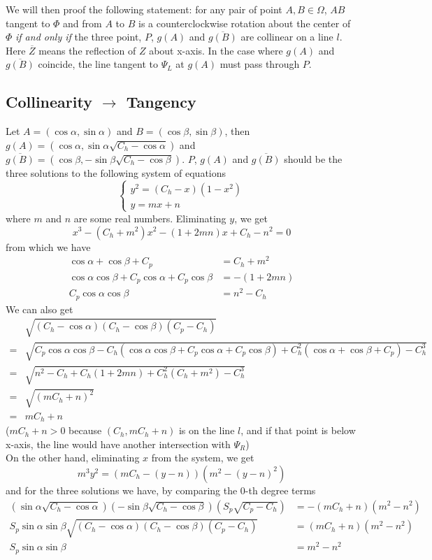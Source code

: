 \documentclass[]{article}
\begin{document}
We will then proof the following statement: for any pair of point $A, B \in \Omega$, $AB$ tangent to $\Phi$ and from $A$ to $B$ is a counterclockwise rotation about the center of $\Phi$ \textit{if and only if} the three point, $P$, $g(A)$ and $\overline{g(B)}$ are collinear on a line $l$. Here $\overline{Z}$ means the reflection of $Z$ about x-axis. In the case where $g(A)$ and $\overline{g(B)}$ coincide, the line tangent to $\Psi_L$ at $g(A)$ must pass through $P$.

\subsection{Collinearity $\to$ Tangency}
Let $A = (\cos\alpha, \sin\alpha)$ and $B = (\cos\beta,\sin\beta)$, then $g(A) = (\cos\alpha, \sin\alpha\sqrt{C_h - \cos\alpha})$ and  $\overline{g(B)} = (\cos\beta, -\sin\beta\sqrt{C_h - \cos\beta})$.  $P$, $g(A)$ and $\overline{g(B)}$ should be the three solutions to the following system of equations
\[
\begin{cases}
y^2 = \left(C_h-x\right)(1-x^2)\\
y = mx + n
\end{cases}
\]
where $m$ and $n$ are some real numbers. Eliminating $y$, we get
\[
x^3 - (C_h+m^2)x^2-(1+2mn)x+C_h-n^2=0
\]
from which we have 
\begin{align*}
\cos\alpha+\cos\beta+C_p &= C_h + m^2\\
\cos\alpha\cos\beta + C_p\cos\alpha +C_p\cos\beta  &= -(1+2mn)\\
C_p\cos\alpha\cos\beta  &= n^2-C_h
\end{align*}
We can also get
\begin{align*}
&\sqrt{(C_h-\cos\alpha)(C_h-\cos\beta)(C_p-C_h)} \\
=&\sqrt{C_p\cos\alpha\cos\beta  - C_h(\cos\alpha\cos\beta +C_p \cos\alpha +C_p\cos\beta ) +C_h^2(\cos\alpha+\cos\beta+C_p)-C_h^3}\\
=&\sqrt{n^2-C_h + C_h(1+2mn) +C_h^2(C_h + m^2)-C_h^3}\\
=&\sqrt{(mC_h+n)^2}\\
=&mC_h+n
\end{align*}
($mC_h+n > 0$ because $(C_h, mC_h+n)$ is on the line $l$, and if that point is below x-axis, the line would have another intersection with $\Psi_R$) \\On the other hand, eliminating $x$ from the system, we get
\[
m^3y^2 = (mC_h - (y-n))(m^2 - (y-n)^2)
\]
and for the three solutions we have, by comparing the 0-th degree terms
\begin{align*}
 (\sin\alpha\sqrt{C_h - \cos\alpha}) (-\sin\beta\sqrt{C_h - \cos\beta}) (S_p \sqrt{C_p-C_h}) &= -(mC_h+n)(m^2-n^2)\\
S_p\sin\alpha\sin\beta \sqrt{(C_h - \cos\alpha)(C_h - \cos\beta)(C_p-C_h)} &= (mC_h+n)(m^2-n^2)\\
 S_p\sin\alpha\sin\beta  &= m^2 - n^2
\end{align*}
\end{document}
